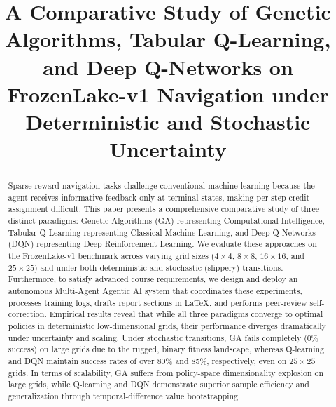 \documentclass[conference]{IEEEtran}
\begin{document}
\title{A Comparative Study of Genetic Algorithms, Tabular Q-Learning, and Deep Q-Networks on FrozenLake-v1 Navigation under Deterministic and Stochastic Uncertainty}

\author{
\and
{}
\and
{}
}

\maketitle

\begin{abstract}
Sparse-reward navigation tasks challenge conventional machine learning because the agent receives informative feedback only at terminal states, making per-step credit assignment difficult.
This paper presents a comprehensive comparative study of three distinct paradigms: Genetic Algorithms (GA) representing Computational Intelligence, Tabular Q-Learning representing Classical Machine Learning, and Deep Q-Networks (DQN) representing Deep Reinforcement Learning. We evaluate these approaches on the FrozenLake-v1 benchmark across varying grid sizes ($4\times4$, $8\times8$, $16\times16$, and $25\times25$) and under both deterministic and stochastic (slippery) transitions. Furthermore, to satisfy advanced course requirements, we design and deploy an autonomous Multi-Agent Agentic AI system that coordinates these experiments, processes training logs, drafts report sections in LaTeX, and performs peer-review self-correction.
Empirical results reveal that while all three paradigms converge to optimal policies in deterministic low-dimensional grids, their performance diverges dramatically under uncertainty and scaling. Under stochastic transitions, GA fails completely (0\% success) on large grids due to the rugged, binary fitness landscape, whereas Q-learning and DQN maintain success rates of over 80\% and 85\%, respectively, even on $25\times25$ grids. In terms of scalability, GA suffers from policy-space dimensionality explosion on large grids, while Q-learning and DQN demonstrate superior sample efficiency and generalization through temporal-difference value bootstrapping.
\end{abstract}
\end{document}
